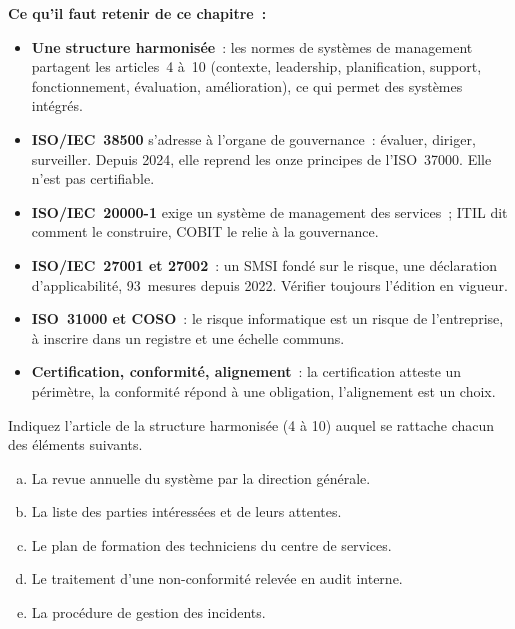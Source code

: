 \separateur

\begin{boxresume}
\textbf{Ce qu'il faut retenir de ce chapitre~:}
\begin{itemize}
    \item \textbf{Une structure harmonisée}~: les normes de systèmes de
          management partagent les articles~4 à~10 (contexte, leadership,
          planification, support, fonctionnement, évaluation,
          amélioration), ce qui permet des systèmes intégrés.
    \item \textbf{ISO/IEC~38500} s'adresse à l'organe de gouvernance~:
          évaluer, diriger, surveiller. Depuis 2024, elle reprend les onze
          principes de l'ISO~37000. Elle n'est pas certifiable.
    \item \textbf{ISO/IEC~20000-1} exige un système de management des
          services~; ITIL dit comment le construire, COBIT le relie à la
          gouvernance.
    \item \textbf{ISO/IEC~27001 et 27002}~: un SMSI fondé sur le risque, une
          déclaration d'applicabilité, 93~mesures depuis 2022. Vérifier
          toujours l'édition en vigueur.
    \item \textbf{ISO~31000 et COSO}~: le risque informatique est un risque
          de l'entreprise, à inscrire dans un registre et une échelle
          communs.
    \item \textbf{Certification, conformité, alignement}~: la certification
          atteste un périmètre, la conformité répond à une obligation,
          l'alignement est un choix.
\end{itemize}
\end{boxresume}

\bigskip

\begin{boxexo}[title={\ding{45}\quad Exercice~9.1. Quel article~? \niveaubase}]
Indiquez l'article de la structure harmonisée (4 à 10) auquel se rattache
chacun des éléments suivants.
\begin{enumerate}[(a)]
    \item La revue annuelle du système par la direction générale.
    \item La liste des parties intéressées et de leurs attentes.
    \item Le plan de formation des techniciens du centre de services.
    \item Le traitement d'une non-conformité relevée en audit interne.
    \item La procédure de gestion des incidents.
\end{enumerate}
\end{boxexo}

